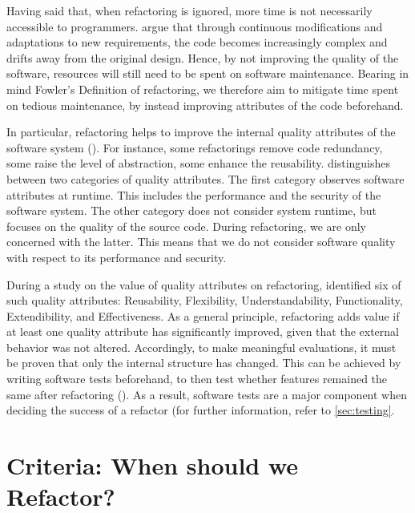 Having said that, when refactoring is ignored, more time is not necessarily accessible to programmers. 
\textcite{mens2003} argue that through continuous modifications and adaptations to new requirements, 
	the code becomes increasingly complex and drifts away from the original design.
Hence, by not improving the quality of the software, resources will still need to be spent on software maintenance. Bearing in mind Fowler's Definition of refactoring, 
	we therefore aim to mitigate time spent on tedious maintenance, 
by instead improving attributes of the code beforehand.

In particular, refactoring helps to improve the internal quality attributes of the software system (\cite{mens2004}). 
For instance, some refactorings remove code redundancy, 
	some raise the level of abstraction, 
	some enhance the reusability.
\textcite{bass1998} distinguishes
	between two categories of quality attributes. 
The first category observes software attributes at runtime. This includes the performance and the security of the software system. The other category does not consider system runtime, but focuses on the quality of the source code. During refactoring, we are only concerned with the latter. This means that we do not consider software quality with respect to its performance and security. 

During a study on the value of quality attributes on refactoring, 
	\textcite{alkhazi2020} identified 
	six of such quality attributes: 
	Reusability, Flexibility, Understandability, 
	Functionality, Extendibility, and Effectiveness.
As a general principle, refactoring adds value if at least one quality attribute has significantly improved, given that the external behavior was not altered.
Accordingly, to make meaningful evaluations, 
	it must be proven that only the internal structure has changed.
This can be achieved by writing software tests beforehand, to then test whether features remained the same after refactoring (\cite{fowler2018}).
As a result, software tests are a major component when deciding the success of a refactor (for further information, refer to \ref{sec:testing}.



\section{Criteria: When should we Refactor?}
\label{sec:criteria}

